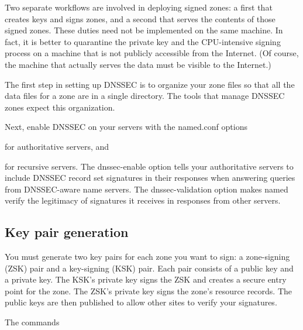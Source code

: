 Two separate workflows are involved in deploying signed zones: a first
that creates keys and signs zones, and a second that serves the contents
of those signed zones. These duties need not be implemented on the same
machine. In fact, it is better to quarantine the private key and the
CPU-intensive signing process on a machine that is not publicly
accessible from the Internet. (Of course, the machine that actually
serves the data must be visible to the Internet.)

The first step in setting up DNSSEC is to organize your zone files so
that all the data files for a zone are in a single directory. The tools
that manage DNSSEC zones expect this organization.

Next, enable DNSSEC on your servers with the {named.conf} options


for authoritative servers, and


for recursive servers. The {dnssec-enable} option tells your
authoritative servers to include DNSSEC record set signatures in their
responses when answering queries from DNSSEC-aware name servers. The
{dnssec-validation} option makes {named} verify the legitimacy of
signatures it receives in responses from other servers.

\protect\hypertarget{part0024_split_063.html}{}{}

\hypertarget{part0024_split_063.htmlux5cux23_idContainer1069}{}
\hypertarget{part0024_split_063.htmlux5cux23calibre_pb_62}{%
\subsection[Key pair
generation]{\texorpdfstring{\protect\hypertarget{part0024_split_063.htmlux5cux23_idTextAnchor942}{}{}Key
pair
generation}{Key pair generation}}\label{part0024_split_063.htmlux5cux23calibre_pb_62}}

You must generate two key pairs for each zone you want to sign: a
zone-signing (ZSK) pair and a key-signing (KSK) pair. Each pair consists
of a public key and a private key. The KSK's private key signs the ZSK
and creates a secure entry point for the zone. The ZSK's private key
signs the zone's resource records. The public keys are then published to
allow other sites to verify your signatures.

The commands


